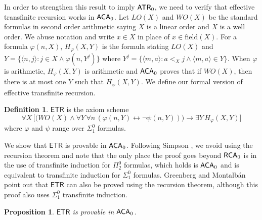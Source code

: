 \documentclass{amsart}
\newtheorem{prop}[thm]{Proposition}
\theoremstyle{definition}
\newtheorem{defn}[thm]{Definition}
\theoremstyle{remark}
\newcommand{\system}[1]{\mbox{\fontfamily{cmss}\fontshape{n}\fontseries{m}%
    \selectfont#1}}
\newcommand{\RCA}{\system{RCA}\ensuremath{_0}}
\newcommand{\ACA}{\system{ACA}\ensuremath{_0}}
\newcommand{\ATR}{\system{ATR}\ensuremath{_0}}
\begin{document}
In order to strengthen this result to imply $\ATR$, we need to verify that
effective transfinite recursion works in $\ACA$.
Let $LO(X)$ and $WO(X)$ be the standard formulas in second order arithmetic saying $X$ is a linear order and $X$ is a well order. We abuse notation and write $x \in X$ in  
place of $x \in \text{field}(X)$. For a formula $\varphi(n,X)$, $H_{\varphi}(X,Y)$ is the formula stating $LO(X)$ and $Y = \{ \langle n,j \rangle : j \in X  \wedge  
\varphi(n,Y^j) \}$ where $Y^j = \{ \langle m,a \rangle : a <_X j \wedge \langle m,a \rangle \in Y \}$. When $\varphi$ is arithmetic, $H_{\varphi}(X,Y)$ is 
arithmetic and $\ACA$ proves that if $WO(X)$, then there is at most one $Y$ such that $H_{\varphi}(X,Y)$. We define our formal version of effective transfinite recursion. 

\begin{defn}
$\mathsf{ETR}$ is the axiom scheme
\[
\forall X \, \Big[ \big( WO(X) \wedge \forall Y \, \forall n \, (\varphi(n,Y) \leftrightarrow \neg \psi(n,Y)) \big) \rightarrow \exists Y \, H_{\varphi}(X,Y) \Big]
\]
where $\varphi$ and $\psi$ range over $\Sigma^0_1$ formulas. 
\end{defn}

We show that $\mathsf{ETR}$ is provable in $\ACA$. Following Simpson \cite{sosa}, we avoid using the recursion theorem and note that 
the only place the proof goes beyond $\RCA$ is in the use of transfinite induction for $\Pi^0_2$ formulas, which holds is $\ACA$ and is equivalent to transfinite induction for 
$\Sigma^0_1$ formulas. Greenberg and Montalb\'{a}n \cite{GM} point out that $\mathsf{ETR}$ can also be proved using the recursion theorem, although this proof also uses 
$\Sigma^0_1$ transfinite induction. 

\begin{prop}
$\mathsf{ETR}$ is provable in $\ACA$. 
\end{prop}
\end{document}
